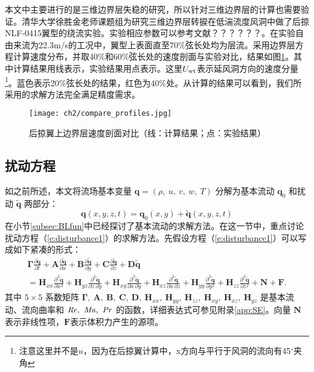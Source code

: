 本文中主要进行的是三维边界层失稳的研究，所以针对三维边界层的计算也需要验证。清华大学徐胜金老师课题组为研究三维边界层转捩在低湍流度风洞中做了后掠NLF-0415翼型的绕流实验。实验相应参数可以参考文献？？？？？？。在实验自由来流为22.3m/s的工况中，翼型上表面直至70\%弦长处均为层流。采用边界层方程计算速度分布，并取40\%和60\%弦长处的速度剖面与实验对比，结果如图\ref{f:ble_vs_exp}。其中计算结果用线表示，实验结果用点表示。这里$U_{\rm wt}$表示延风洞方向的速度分量\footnote{注意这里并不是$u$，因为在后掠翼计算中，x方向与平行于风洞的流向有45$^\circ$夹角}。蓝色表示20\%弦长处的结果，红色为40\%处。从计算的结果可以看到，我们所采用的求解方法完全满足精度需求。
\begin{figure}[h]
  \centering
  \texttt{[image: ch2/compare\_profiles.jpg]}
  \caption{后掠翼上边界层速度剖面对比（线：计算结果；点：实验结果）}\label{f:ble_vs_exp}
\end{figure}

\subsection{扰动方程}\label{subsec:STBfun}
如之前所述，本文将流场基本变量 $\mathbf{q}=(\rho,~u,~v,~w,~T)$ 分解为基本流动 $\mathbf{q}_0$ 和扰动 $\tilde{\mathbf{q}}$ 两部分：
\begin{equation}\label{EQ_STa}
\mathbf{q}(x,y,z,t)=\mathbf{q}_0(x,y)
+\tilde{\mathbf{q}}(x,y,z,t)
\end{equation}
在小节\ref{subsec:BLfun}中已经探讨了基本流动的求解方法。在这一节中，重点讨论扰动方程（\ref{e:disturbance1}）的求解方法。先假设方程（\ref{e:disturbance1}）可以写成如下紧凑的形式：
\begin{multline}
 \label{e:EQ_ST}
 {\mathbf{\Gamma }}\frac{{\partial {\mathbf{\tilde q}}}}
 {{\partial t}} + {\mathbf{A}}\frac{{\partial {\mathbf{\tilde q}}}}
 {{\partial x}} + {\mathbf{B}}\frac{{\partial {\mathbf{\tilde q}}}}
 {{\partial y}} + {\mathbf{C}}\frac{{\partial {\mathbf{\tilde q}}}}
 {{\partial z}} + {\mathbf{D\tilde q}}\\ = {\mathbf{H}}_{xx} \frac{{\partial ^2 {\mathbf{\tilde q}}}}
 {{\partial x^2 }} + {\mathbf{H}}_{yz} \frac{{\partial ^2 {\mathbf{\tilde q}}}}
 {{\partial z\,\partial y}} + {\mathbf{H}}_{xy} \frac{{\partial ^2 {\mathbf{\tilde q}}}}
 {{\partial x\,\partial y}} + {\mathbf{H}}_{xz} \frac{{\partial ^2 {\mathbf{\tilde q}}}}
 {{\partial x\,\partial z}} + {\mathbf{H}}_{yy} \frac{{\partial ^2 {\mathbf{\tilde q}}}}
 {{\partial y^2 }} + {\mathbf{H}}_{zz} \frac{{\partial ^2 {\mathbf{\tilde q}}}}
 {{\partial z^2 }} + {\mathbf{N}} + {\mathbf{F}}.
\end{multline}
其中 $5\times5$ 系数矩阵 $\mathbf{\Gamma},~\mathbf{A},~\mathbf{B},~
\mathbf{C},~\mathbf{D},~\mathbf{H}_{xx},~
\mathbf{H}_{yy},~\mathbf{H}_{zz},~\mathbf{H}_{xy},~
\mathbf{H}_{xz},~\mathbf{H}_{yz}$ 是基本流动、流向曲率和 $\mbox{{\textit{Re}}},~\mbox{{\textit{Ma}}},~\mbox{{\textit{Pr}}}$ 的函数，详细表达式可参见附录\ref{app:SE}。向量 $\mathbf{{N}}$ 表示非线性项，$\mathbf{F}$表示体积力产生的源项。


